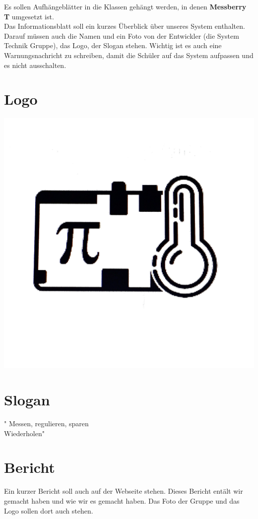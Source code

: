 Es sollen Aufh\"angebl\"atter in die Klassen geh\"angt werden, in denen \textbf{Messberry T} umgesetzt ist.\\
	Das Informationsblatt soll ein kurzes \"Uberblick \"uber unseres System enthalten.
	Darauf m\"ussen auch die Namen und ein Foto von der Entwickler (die System Technik Gruppe), 
	das Logo, der Slogan stehen.
	Wichtig ist es auch eine Warnungsnachricht zu schreiben, damit die Sch\"uler auf das System
	aufpassen und es nicht ausschalten. 
	\section{Logo}
				\includegraphics[scale=0.1]{./Bilder/logo.jpg}
	\section{Slogan}
	" Messen, regulieren, sparen\\
		Wiederholen" 
	
	\section{Bericht}
	Ein kurzer Bericht soll auch auf der Webseite stehen.
	Dieses Bericht ent\"alt wir gemacht haben und wie wir es gemacht haben. Das Foto der Gruppe und das Logo sollen dort auch stehen.
	
